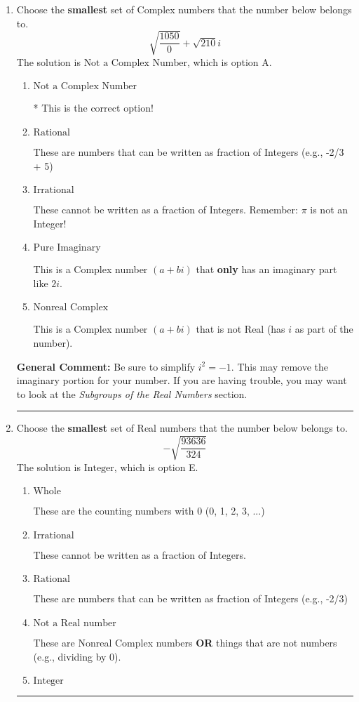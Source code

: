 \documentclass{extbook}[14pt]
\newcommand{\litem}[1]{\item #1

\rule{\textwidth}{0.4pt}}
\begin{document}
\begin{enumerate}\litem{
Choose the \textbf{smallest} set of Complex numbers that the number below belongs to.
\[ \sqrt{\frac{1050}{0}}+\sqrt{210} i \]The solution is \( \text{Not a Complex Number} \), which is option A.\begin{enumerate}[label=\Alph*.]
\item \( \text{Not a Complex Number} \)

* This is the correct option!
\item \( \text{Rational} \)

These are numbers that can be written as fraction of Integers (e.g., -2/3 + 5)
\item \( \text{Irrational} \)

These cannot be written as a fraction of Integers. Remember: $\pi$ is not an Integer!
\item \( \text{Pure Imaginary} \)

This is a Complex number $(a+bi)$ that \textbf{only} has an imaginary part like $2i$.
\item \( \text{Nonreal Complex} \)

This is a Complex number $(a+bi)$ that is not Real (has $i$ as part of the number).
\end{enumerate}

\textbf{General Comment:} Be sure to simplify $i^2 = -1$. This may remove the imaginary portion for your number. If you are having trouble, you may want to look at the \textit{Subgroups of the Real Numbers} section.
}
\litem{
Choose the \textbf{smallest} set of Real numbers that the number below belongs to.
\[ -\sqrt{\frac{93636}{324}} \]The solution is \( \text{Integer} \), which is option E.\begin{enumerate}[label=\Alph*.]
\item \( \text{Whole} \)

These are the counting numbers with 0 (0, 1, 2, 3, ...)
\item \( \text{Irrational} \)

These cannot be written as a fraction of Integers.
\item \( \text{Rational} \)

These are numbers that can be written as fraction of Integers (e.g., -2/3)
\item \( \text{Not a Real number} \)

These are Nonreal Complex numbers \textbf{OR} things that are not numbers (e.g., dividing by 0).
\item \( \text{Integer} \)


\end{enumerate}}
\end{enumerate}
\end{document}
